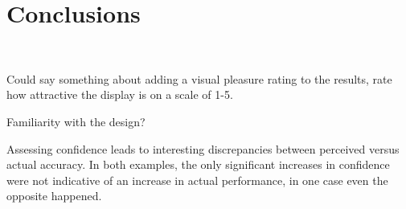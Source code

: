 \section{Conclusions}~\label{conclusions}

Could say something about adding a visual pleasure rating to the results, rate how attractive the display is on a scale of 1-5.

Familiarity with the design?

Assessing confidence leads to interesting discrepancies between perceived versus actual accuracy. In both examples, the only significant increases in confidence were not indicative of an increase in actual performance, in one case even the opposite happened. 